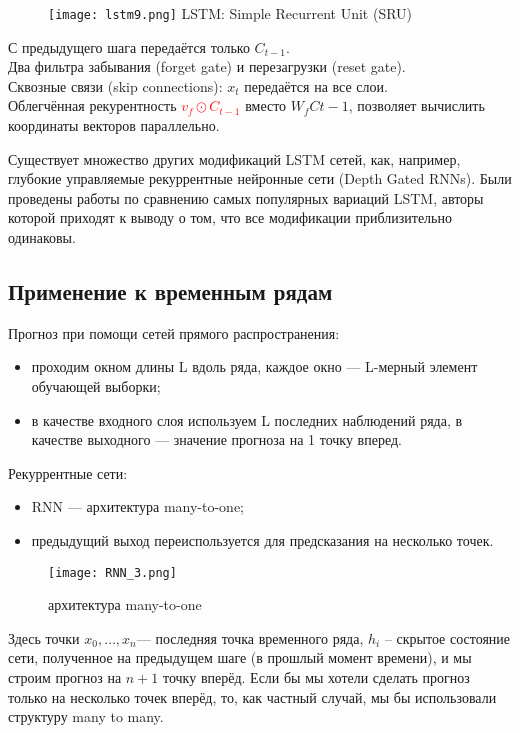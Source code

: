 \documentclass{article}
\begin{document}
      \begin{figure}[H]
	        \centering
	        \texttt{[image: lstm9.png]}
	    {LSTM: Simple Recurrent Unit (SRU)}
	    \end{figure}
     С предыдущего шага передаётся только $C_{t-1}$.
     \\ Два фильтра забывания (forget gate) и перезагрузки (reset gate).\\
     Сквозные связи (skip connections): $x_t$ передаётся на все слои.\\
     Облегчённая рекурентность \textcolor{red}{$v_f\odot C_{t-1}$} вместо $W_f C{t-1}$, позволяет вычислить координаты векторов параллельно.
     
     Существует множество других модификаций LSTM сетей, как, например, глубокие управляемые рекуррентные нейронные сети (Depth Gated RNNs). Были проведены работы по сравнению самых популярных вариаций LSTM,
авторы которой приходят к выводу о том, что все модификации приблизительно одинаковы.

\subsection{Применение к временным рядам}
     Прогноз при помощи сетей прямого распространения:
     \begin{itemize}
         \item проходим окном длины L вдоль ряда, каждое окно — L-мерный
элемент обучающей выборки;
\item в качестве входного слоя используем L последних наблюдений ряда, в
качестве выходного — значение прогноза на 1 точку вперед.
     \end{itemize}


Рекуррентные сети:
\begin{itemize}
    \item RNN — архитектура many-to-one;
    \item предыдущий выход переиспользуется для предсказания на несколько
точек. 
\end{itemize}

      \begin{figure}[H]
	        \centering
	        \texttt{[image: RNN\_3.png]}
	        \caption{архитектура many-to-one}
	    \end{figure}

Здесь точки $x_0,\ldots,x_n$— последняя точка временного ряда, $h_i$
-- скрытое состояние сети, полученное на предыдущем шаге (в прошлый момент времени), и мы строим прогноз на $n+1$  
точку вперёд.  Если бы мы хотели сделать прогноз только на несколько точек вперёд, то, как частный случай, мы бы использовали структуру many to many.
\end{document}
